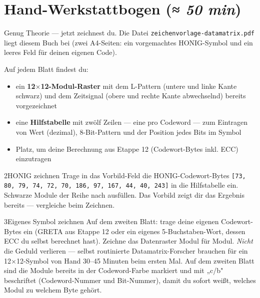 \section{Hand-Werkstattbogen \normalfont(\textit{≈ 50 min})}

Genug Theorie — jetzt zeichnest du. Die Datei
\texttt{zeichenvorlage-datamatrix.pdf} liegt diesem Buch bei (zwei
A4-Seiten: ein vorgemachtes HONIG-Symbol und ein leeres Feld für
deinen eigenen Code).

Auf jedem Blatt findest du:

\begin{itemize}
\item ein \textbf{12$\times$12-Modul-Raster} mit dem L-Pattern (untere
  und linke Kante schwarz) und dem Zeitsignal (obere und rechte Kante
  abwechselnd) bereits vorgezeichnet
\item eine \textbf{Hilfstabelle} mit zwölf Zeilen — eine pro Codeword
  — zum Eintragen von Wert (dezimal), 8-Bit-Pattern und der Position
  jedes Bits im Symbol
\item Platz, um deine Berechnung aus Etappe 12 (Codewort-Bytes inkl.
  ECC) einzutragen
\end{itemize}

\begin{bleistiftuebung}{2}{HONIG zeichnen}
Trage in das Vorbild-Feld die HONIG-Codewort-Bytes
\texttt{[73, 80, 79, 74, 72, 70, 186, 97, 167, 44, 40, 243]}
in die Hilfstabelle ein. Schwarze Module der Reihe nach
ausfüllen. Das Vorbild zeigt dir das Ergebnis bereits — vergleiche
beim Zeichnen.
\end{bleistiftuebung}

\begin{bleistiftuebung}{3}{Eigenes Symbol zeichnen}
Auf dem zweiten Blatt: trage deine eigenen Codewort-Bytes ein
(GRETA aus Etappe 12 oder ein eigenes 5-Buchstaben-Wort, dessen
ECC du selbst berechnet hast). Zeichne das Datenraster Modul für
Modul. \emph{Nicht} die Geduld verlieren — selbst routinierte
Datamatrix-Forscher brauchen für ein 12$\times$12-Symbol von Hand
30--45 Minuten beim ersten Mal. Auf dem zweiten Blatt sind die
Module bereits in der Codeword-Farbe markiert und mit „c/b"
beschriftet (Codeword-Nummer und Bit-Nummer), damit du
sofort weißt, welches Modul zu welchem Byte gehört.
\end{bleistiftuebung}




